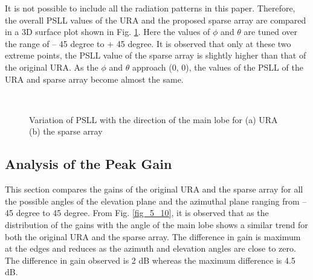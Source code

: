 It is not possible to include all the radiation patterns in this paper. Therefore, the overall PSLL values of the URA and the proposed sparse array are compared in a 3D surface plot shown in Fig. \ref{fig_5_9}. Here the values of $\phi$ and $\theta$ are tuned over the range of -- 45 degree to + 45 degree. It is observed that only at these two extreme points, the PSLL value of the sparse array is slightly higher than that of the original URA. As the $\phi$ and $\theta$ approach (0, 0), the values of the PSLL of the URA and sparse array become almost the same.

\begin{figure}
  \centering
   ~~~~
  \\
  \caption{Variation of PSLL with the direction of the main lobe for (a) URA (b) the sparse array} \label{fig_5_9}
\end{figure}

\subsection{Analysis of the Peak Gain}

This section compares the gains of the original URA and the sparse array for all the possible angles of the elevation plane and the azimuthal plane ranging from -- 45 degree to 45 degree. From Fig. \ref{fig_5_10}, it is observed that as the distribution of the gains with the angle of the main lobe shows a similar trend for both the original URA and the sparse array. The difference in gain is maximum at the edges and reduces as the azimuth and elevation angles are close to zero. The difference in gain observed is 2 dB whereas the maximum difference is 4.5 dB.

